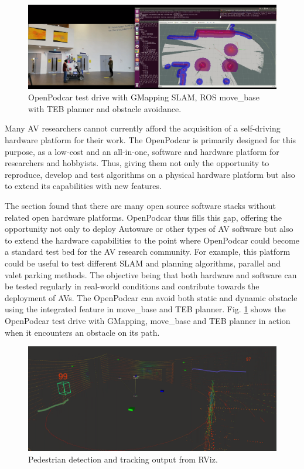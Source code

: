 \documentclass[a4paper]{article}
\begin{document}
	\begin{figure}
		\centering
		\includegraphics[width=\columnwidth]{software/move_base_collision_avoidance.png}
		\caption{OpenPodcar test drive with GMapping SLAM, ROS move\_base with TEB planner and obstacle avoidance.}
		\label{fig:testDrive_gmapping}
	\end{figure}
	
	Many AV researchers cannot currently afford the acquisition of a self-driving hardware platform for their work. The OpenPodcar is primarily designed for this purpose, as a low-cost and an all-in-one, software and hardware platform for researchers and hobbyists. Thus, giving them not only the opportunity to reproduce, develop and test algorithms on a physical hardware platform but also to extend its capabilities with new features. 
	
	The  section found that there are many open source software stacks without related open hardware platforms.  OpenPodcar thus fills this gap, offering the opportunity not only to deploy Autoware or other types of AV software but also to extend the hardware capabilities to the point where OpenPodcar could become a standard test bed for the AV research community. For example, this platform could be useful to test different SLAM and planning algorithms, parallel and valet parking methods. The objective being that both hardware and software can be tested regularly in real-world conditions and contribute towards the deployment of AVs. The OpenPodcar can avoid both static and dynamic obstacle using the integrated feature in move\_base and TEB planner. Fig. \ref{fig:testDrive_gmapping} shows the OpenPodcar test drive with GMapping, move\_base and TEB planner in action when it encounters an obstacle on its path.     
	
	\begin{figure}
		\centering
		\includegraphics[width=0.7\columnwidth]{software/tracker.png}
		\caption{Pedestrian detection and tracking output from RViz.}
		\label{fig:detection_tracking}
	\end{figure}
	
\end{document}
